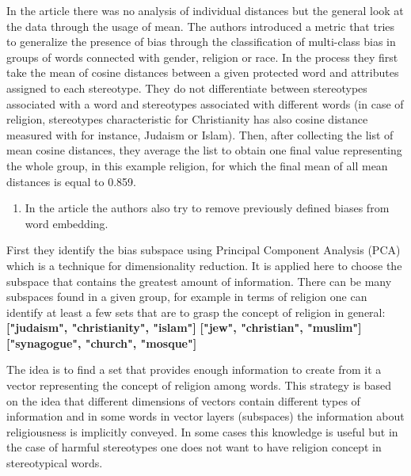 \documentclass[
  12pt,
]{book}
\providecommand{\tightlist}{%
  \setlength{\itemsep}{0pt}\setlength{\parskip}{0pt}}
\begin{document}
\pagebreak

In the article there was no analysis of individual distances but the general look at the data through the usage of mean. The authors introduced a metric that tries to generalize the presence of bias through the classification of multi-class bias in groups of words connected with gender, religion or race. In the process they first take the mean of cosine distances between a given protected word and attributes assigned to each stereotype. They do not differentiate between stereotypes associated with a word and stereotypes associated with different words (in case of religion, stereotypes characteristic for Christianity has also cosine distance measured with for instance, Judaism or Islam). Then, after collecting the list of mean cosine distances, they average the list to obtain one final value representing the whole group, in this example religion, for which the final mean of all mean distances is equal to 0.859.

\begin{enumerate}
\def\labelenumi{\arabic{enumi}.}
\setcounter{enumi}{2}
\tightlist
\item
  In the article the authors also try to remove previously defined biases from word embedding.
\end{enumerate}

First they identify the bias subspace using Principal Component Analysis (PCA) which is a technique for dimensionality reduction. It is applied here to choose the subspace that contains the greatest amount of information. There can be many subspaces found in a given group, for example in terms of religion one can identify at least a few sets that are to grasp the concept of religion in general:
\newline
\textbf{["judaism", "christianity", "islam"]}
\newline
\textbf{["jew", "christian", "muslim"]}
\newline
\textbf{["synagogue", "church", "mosque"]}
\newline

The idea is to find a set that provides enough information to create from it a vector representing the concept of religion among words. This strategy is based on the idea that different dimensions of vectors contain different types of information and in some words in vector layers (subspaces) the information about religiousness is implicitly conveyed. In some cases this knowledge is useful but in the case of harmful stereotypes one does not want to have religion concept in stereotypical words.
\end{document}
